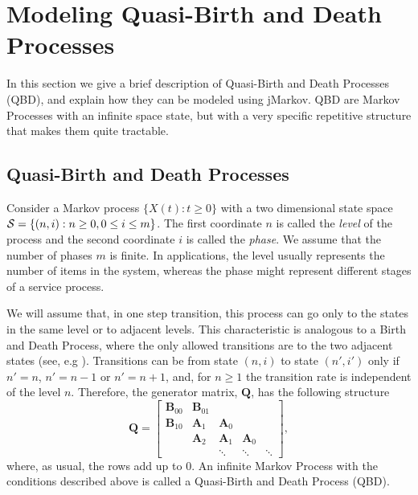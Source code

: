 \documentclass[11pt,letterpaper]{article}
\newcommand{\bA}{{\mathbf A}}
\newcommand{\bB}{{\mathbf B}}
\newcommand{\bQ}{{\mathbf Q}}
\newcommand{\cS}{{\cal S}}
\begin{document}
\section{Modeling Quasi-Birth and Death Processes}\label{sec:QBD}

In this section we give a brief description of Quasi-Birth and Death Processes
(QBD), and explain how they can be modeled using jMarkov. QBD are Markov
Processes with an infinite space state, but with a very specific repetitive
structure that makes them quite tractable.

\subsection{Quasi-Birth and Death Processes}
\label{sec:QuasiBirthAndDeathProcesses}


Consider a Markov process $\{X(t):t\geq0\}$ with a two dimensional state space
$\cS=\{(n,i):n \geq 0, 0\leq i\leq m \}$. The first coordinate $n$ is called the
\emph{level} of the process and the second coordinate $i$ is called the
\emph{phase}. We assume that the number of phases $m$ is finite. In
applications, the level usually represents the number of items in the system,
whereas the phase might represent different stages of a service process.

We will assume that, in one step transition, this process can go only to the
states in the same level or to adjacent levels. This characteristic is analogous
to a Birth and Death Process, where the only allowed transitions are to the two
adjacent states (see, e.g \cite{kulk95}). Transitions can be from state $(n,i)$
to state $(n',i')$ only if $n' = n$, $n'=n-1$ or $n'=n+1$, and, for $n\ge 1$ the
transition rate is independent of the level $n$. Therefore, the generator
matrix, $\bQ$, has the following structure
\begin{equation*}\label{eq:QBDMatrix}
\bQ=
        \begin{bmatrix}
          \bB_{00}& \bB_{01}&             &             &  \\
          \bB_{10}& \bA_1& \bA_0&             &  \\
                        & \bA_2& \bA_1& \bA_0&  \\
                        &             & \ddots      & \ddots      & \ddots
        \end{bmatrix},
\end{equation*}
where, as usual, the rows add up to 0. An infinite Markov Process with the
conditions described above is called a Quasi-Birth and Death Process (QBD).
\end{document}
